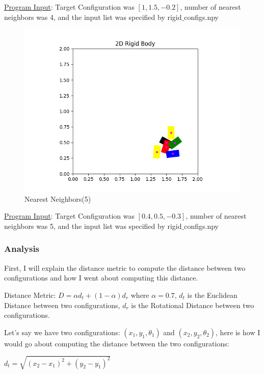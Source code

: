 \documentclass{article}
\begin{document}
\underline{Program Input}: Target Configuration was $[1, 1.5, -0.2]$, number of nearest neighbors was 4, and the input list was specified by rigid$\_$configs.npy

\newpage
\begin{figure}[h!]
	\includegraphics[width= 0.9 \linewidth]{P2_NearestNeighbor(5).png}
	\centering
	\caption{Nearest Neighbors(5)}
	\label{P2_NearestNeighbor(5).png}
\end{figure}

\underline{Program Input}: Target Configuration was $[0.4, 0.5, -0.3]$, number of nearest neighbors was 5, and the input list was specified by rigid$\_$configs.npy

\subsubsection{Analysis}
First, I will explain the distance metric to compute the distance between two configurations and how I went about computing this distance.  \newline 

Distance Metric: $D = \alpha d_t + (1 - \alpha) d_r$ \newline 
where $\alpha = 0.7$, $d_t$ is the Euclidean Distance between two configurations, $d_r$ is the Rotational Distance between two configurations. 

Let's say we have two configurations: $(x_1, y_1, \theta_1)$ and $(x_2, y_2, \theta_2)$, here is how I would go about computing the distance between the two configurations: \newline 

$d_t = \sqrt{(x_2 - x_1)^2 + (y_2 - y_1)^2}$ \newline 
\end{document}
